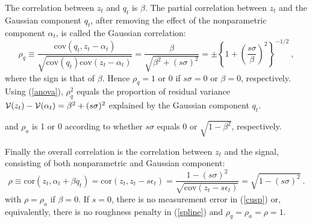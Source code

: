 \documentclass[authoryear]{elsarticle}
\newcommand{\cov}{\mathrm{cov}}
\newcommand{\eps}{\epsilon}
\newcommand{\Ex}{{\cal E}}
\newcommand{\cor}{\mathrm{cor}}
\newcommand{\eref}[1]{(\ref{#1})}
\newcommand{\cq}{\ , \qquad}
\newcommand{\Vx}{{\cal V}}
\newcommand{\be}[1]{\begin{equation}\label{#1}}
\newcommand{\ee}{\end{equation}}
\begin{document}
The correlation between $z_t$ and $q_t$ is  $\beta$.  The partial correlation between $z_t$ and  the Gaussian component $q_t$, after removing the effect of the nonparametric component $\alpha_t$,  is called the Gaussian correlation:
\be{rho}
\rho_q\equiv\frac{\cov(q_t,z_t-\alpha_t)}{\sqrt{\cov(q_t)\cov(z_t-\alpha_t)}} = \frac{\beta}{\sqrt{\beta^2+(s\sigma)^2}}=\pm\left\{1+\left(\frac{s\sigma}{\beta}\right)^2\right\}^{-1/2}\ ,
\ee
where the sign is that of $\beta$.  Hence $\rho_q=1$ or 0 if  $s\sigma=0$ or $\beta=0$, respectively.
Using \eref{anova},  $\rho_q^2$ equals the proportion of  residual variance $\Vx(z_t)-\Vx(\alpha_t)=\beta^2+(s\sigma)^2$ explained by  the Gaussian component $q_t$.   
 

and  $\rho_a$ is 1 or 0 according to whether  $s\sigma$ equals 0 or  $\sqrt{1-\beta^2}$, respectively. 

Finally the overall correlation is the correlation between $z_t$ and the signal, consisting of both nonparametric and Gaussian component:
$$
\rho\equiv\cor (z_t,\alpha_t+\beta q_t)=\cor(z_t,z_t-s\eps_t)=\frac{1-(s\sigma)^2}{\sqrt{\cov(z_t-s\eps_t)}}=\sqrt{1-(s\sigma)^2}\ .
$$
with $\rho=\rho_a$ if $\beta=0$.   If $s=0$, there is no measurement error in \eref{cusp} or, equivalently, there is no roughness penalty in \eref{spline} and $\rho_q=\rho_a=\rho=1$.

\end{document}
